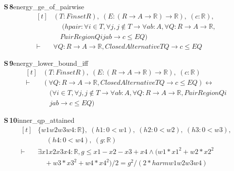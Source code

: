 \documentclass[conference]{IEEEtran}
\theoremstyle{definition}
\newcommand{\lean}[1]{\textsf{\footnotesize #1}}
\begin{document}
\noindent\textbf{S\,8}\quad\lean{energy\_ge\_of\_pairwise}
{\footnotesize\[ \begin{aligned}[t]
&(\mathit{T} : \mathit{Finset} \mathit{R}),\; (\mathit{E} : (\mathit{R} \to \mathit{A} \to \mathbb{R} ) \to \mathbb{R} ),\; (\mathit{c} : \mathbb{R} ),\\
&\quad \; (\mathit{hpair} : \forall \mathit{i} \in \mathit{T}, \forall \mathit{j}, \mathit{j} \notin \mathit{T} \to \forall \mathit{a} \mathit{b} : \mathit{A}, \forall \mathit{Q} : \mathit{R} \to \mathit{A} \to \mathbb{R} ,\\
&\quad \mathit{PairRegion} \mathit{Q} \mathit{i} \mathit{j} \mathit{a} \mathit{b} \to \mathit{c} \leq \mathit{E} \mathit{Q})\\
\vdash\;&\forall \mathit{Q} : \mathit{R} \to \mathit{A} \to \mathbb{R} , \mathit{ClosedAlternative} \mathit{T} \mathit{Q} \to \mathit{c} \leq \mathit{E} \mathit{Q}
\end{aligned} \]}

\noindent\textbf{S\,9}\quad\lean{energy\_lower\_bound\_iff}
{\footnotesize\[ \begin{aligned}[t]
&(\mathit{T} : \mathit{Finset} \mathit{R}),\; (\mathit{E} : (\mathit{R} \to \mathit{A} \to \mathbb{R} ) \to \mathbb{R} ),\; (\mathit{c} : \mathbb{R} )\\
\vdash\;&(\forall \mathit{Q} : \mathit{R} \to \mathit{A} \to \mathbb{R} , \mathit{ClosedAlternative} \mathit{T} \mathit{Q} \to \mathit{c} \leq \mathit{E} \mathit{Q}) \leftrightarrow\\
&\quad (\forall \mathit{i} \in \mathit{T}, \forall \mathit{j}, \mathit{j} \notin \mathit{T} \to \forall \mathit{a} \mathit{b} : \mathit{A}, \forall \mathit{Q} : \mathit{R} \to \mathit{A} \to \mathbb{R} , \mathit{PairRegion} \mathit{Q} \mathit{i}\\
&\quad \mathit{j} \mathit{a} \mathit{b} \to \mathit{c} \leq \mathit{E} \mathit{Q})
\end{aligned} \]}

\noindent\textbf{S\,10}\quad\lean{inner\_qp\_attained}
{\footnotesize\[ \begin{aligned}[t]
&\{ \mathit{w1} \mathit{w2} \mathit{w3} \mathit{w4} : \mathbb{R} \},\; (\mathit{h1} : 0 < \mathit{w1}),\; (\mathit{h2} : 0 < \mathit{w2}),\; (\mathit{h3} : 0 < \mathit{w3}),\\
&\quad \; (\mathit{h4} : 0 < \mathit{w4}),\; (\mathit{g} : \mathbb{R} )\\
\vdash\;&\exists \mathit{x1} \mathit{x2} \mathit{x3} \mathit{x4} : \mathbb{R} , \mathit{g} \leq \mathit{x1} - \mathit{x2} - \mathit{x3} + \mathit{x4} \wedge (\mathit{w1}*\mathit{x1}^{2} + \mathit{w2}*\mathit{x2}^{2}\\
&\quad + \mathit{w3}*\mathit{x3}^{2} + \mathit{w4}*\mathit{x4}^{2}) / 2 = \mathit{g} ^{2} / (2 * \mathit{harm} \mathit{w1} \mathit{w2} \mathit{w3} \mathit{w4})
\end{aligned} \]}
\end{document}
